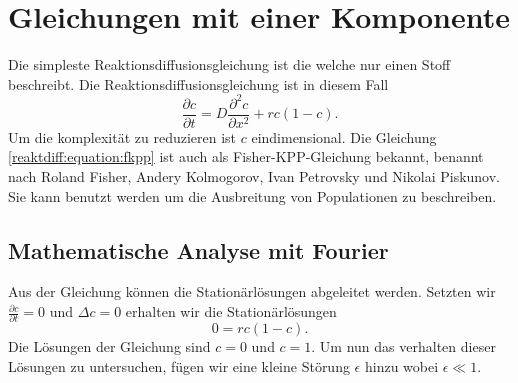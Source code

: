 %
%
%
%
\section{Gleichungen mit einer Komponente
\label{reaktdiff:section:einKomponent}}
Die simpleste Reaktionsdiffusionsgleichung ist die welche nur einen Stoff beschreibt.
Die Reaktionsdiffusionsgleichung ist in diesem Fall
\begin{equation}
\label{reaktdiff:equation:fkpp}
\frac{\partial c}{\partial t} = D \frac{\partial^2 c}{\partial x^2} + rc(1-c).
\end{equation}
Um die komplexität zu reduzieren ist \(c\) eindimensional. 
Die Gleichung \ref{reaktdiff:equation:fkpp} ist auch als Fisher-KPP-Gleichung\cite{reaktdiff:wikipedia_kpp_fisher} bekannt, benannt nach Roland Fisher, Andery Kolmogorov, Ivan Petrovsky und Nikolai Piskunov.
Sie kann benutzt werden um die Ausbreitung von Populationen zu beschreiben.

\subsection{Mathematische Analyse mit Fourier
\label{reaktdiff:subsection:fkppmathe}}
Aus der Gleichung können die Stationärlösungen abgeleitet werden.
Setzten wir \(\frac{\partial c}{\partial t} = 0\) und \(\Delta c = 0\) erhalten wir die Stationärlösungen
\begin{equation*}
\label{reaktdiff:equation:stationaer}
0 = rc(1-c).
\end{equation*}
Die Lösungen der Gleichung sind \(c = 0\) und \(c = 1\).
Um nun das verhalten dieser Lösungen zu untersuchen, fügen wir eine kleine Störung \(\epsilon\) hinzu wobei \(\epsilon \ll 1\).

